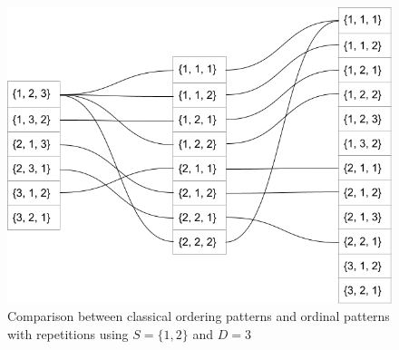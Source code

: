 \documentclass[twocolumn]{article}
\begin{document}
\begin{figure}
    \centering
    \includegraphics[width=.5\textwidth]{comp_N2_D3.png}
    \caption{Comparison between classical ordering patterns and ordinal patterns with repetitions using $S = \{1, 2\}$ and $D=3$}
    \label{fig:my_label}
\end{figure}
\end{document}
